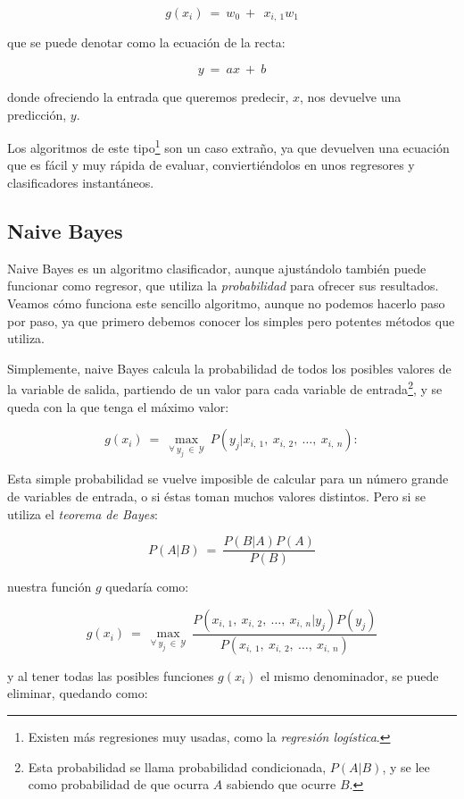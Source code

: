 $$
g(x_{i})\:=\:w_{0}\:+\:\:x_{i,\:1}w_{1}
$$

\noindent
que se puede denotar como la ecuación de la recta:

$$
y\:=\:ax\:+\:b
$$

\noindent
donde ofreciendo la entrada que queremos predecir, $x$, nos devuelve una predicción, $y$.

Los algoritmos de este tipo\footnote{Existen más regresiones muy usadas, como la \emph{regresión logística}.} son un caso extraño, ya que devuelven una ecuación que es fácil y muy rápida de evaluar, conviertiéndolos en unos regresores y clasificadores instantáneos.

\subsection{Naive Bayes} \label{subsec:2.5.4}

Naive Bayes es un algoritmo clasificador, aunque ajustándolo también puede funcionar como regresor, que utiliza la \emph{probabilidad} para ofrecer sus resultados. Veamos cómo funciona este sencillo algoritmo, aunque no podemos hacerlo paso por paso, ya que primero debemos conocer los simples pero potentes métodos que utiliza.

Simplemente, naive Bayes calcula la probabilidad de todos los posibles valores de la variable de salida, partiendo de un valor para cada variable de entrada\footnote{Esta probabilidad se llama probabilidad condicionada, $P(A|B)$, y se lee como probabilidad de que ocurra $A$ sabiendo que ocurre $B$.}, y se queda con la que tenga el máximo valor:

$$
g(x_{i})\:=\:\max_{\forall\:y_{j}\:\in\:\mathcal{Y}}\:P(y_{j}|x_{i,\:1},\:x_{i,\:2},\:\dots,\:x_{i,\:n}):
$$

Esta simple probabilidad se vuelve imposible de calcular para un número grande de variables de entrada, o si éstas toman muchos valores distintos. Pero si se utiliza el \emph{teorema de Bayes}:

$$
P(A|B)\:=\:\frac{P(B|A)P(A)}{P(B)}
$$

\noindent
nuestra función $g$ quedaría como:

$$
g(x_{i})\:=\:\max_{\forall\:y_{j}\:\in\:\mathcal{Y}}\:\frac{P(x_{i,\:1},\:x_{i,\:2},\:\dots,\:x_{i,\:n}|y_{j})P(y_{j})}{P(x_{i,\:1},\:x_{i,\:2},\:\dots,\:x_{i,\:n})}
$$

\noindent
y al tener todas las posibles funciones $g(x_{i})$ el mismo denominador, se puede eliminar, quedando como:

